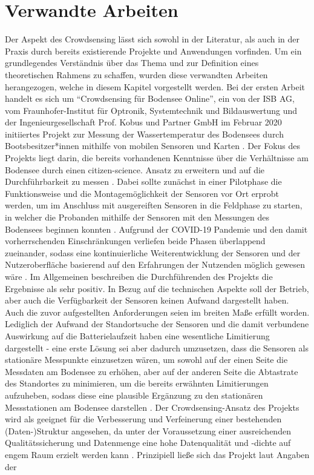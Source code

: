 \section{Verwandte Arbeiten}
\label{sec:related_work}
Der Aspekt des Crowdsensing lässt sich sowohl in der Literatur, als auch in der Praxis durch bereits existierende Projekte und Anwendungen vorfinden. Um ein grundlegendes Verständnis über das Thema und zur Definition eines theoretischen Rahmens zu schaffen, wurden diese verwandten Arbeiten herangezogen, welche in diesem Kapitel vorgestellt werden. \newline Bei der ersten Arbeit handelt es sich um \enquote{Crowdsensing für Bodensee Online}, ein von der ISB AG, vom Fraunhofer-Institut für Optronik, Systemtechnik und Bildauswertung und der Ingenieurgesellschaft Prof. Kobus und Partner GmbH im Februar 2020 initiiertes Projekt zur Messung der Wassertemperatur des Bodensees durch Bootsbesitzer*innen mithilfe von mobilen Sensoren und Karten \cite {Ministerium2021}. Der Fokus des Projekts liegt darin, die bereits vorhandenen Kenntnisse über die Verhältnisse am Bodensee durch einen citizen-science. Ansatz zu erweitern und auf die Durchführbarkeit zu messen \cite{Bodensee2021}. Dabei sollte zunächst in einer Pilotphase die Funktionsweise und die Montagemöglichkeit der Sensoren vor Ort erprobt werden, um im Anschluss mit ausgereiften Sensoren in die Feldphase zu starten, in welcher die Probanden mithilfe der Sensoren mit den Messungen des Bodensees beginnen konnten \cite{Bodensee2021}. Aufgrund der COVID-19 Pandemie und den damit vorherrschenden Einschränkungen verliefen beide Phasen überlappend zueinander, sodass eine kontinuierliche Weiterentwicklung der Sensoren und der Nutzeroberfläche basierend auf den Erfahrungen der Nutzenden möglich gewesen wäre \cite{Bodensee2021}. Im Allgemeinen beschreiben die Durchführenden des Projekts die Ergebnisse als sehr positiv. \newline In Bezug auf die technischen Aspekte soll der Betrieb, aber auch die Verfügbarkeit der Sensoren keinen Aufwand dargestellt haben. Auch die zuvor aufgestellten Anforderungen seien im breiten Maße erfüllt worden. Lediglich der Aufwand der Standortsuche der Sensoren und die damit verbundene Auswirkung auf die Batterielaufzeit haben eine wesentliche Limitierung dargestellt - eine erste Lösung sei aber dadurch umzusetzen, dass die Sensoren als stationäre Messpunkte einzusetzen wären, um sowohl auf der einen Seite die Messdaten am Bodensee zu erhöhen, aber auf der anderen Seite die Abtastrate des Standortes zu minimieren, um die bereits erwähnten Limitierungen aufzuheben, sodass diese eine plausible Ergänzung zu den stationären Messstationen am Bodensee darstellen \cite{Bodensee2021}. Der Crowdsensing-Ansatz des Projekts wird als geeignet für die Verbesserung und Verfeinerung einer bestehenden (Daten-)Struktur angesehen, da unter der Voraussetzung einer ausreichenden Qualitätssicherung und Datenmenge eine hohe Datenqualität und -dichte auf engem Raum erzielt werden kann \cite{Bodensee2021}. Prinzipiell ließe sich das Projekt laut Angaben der 